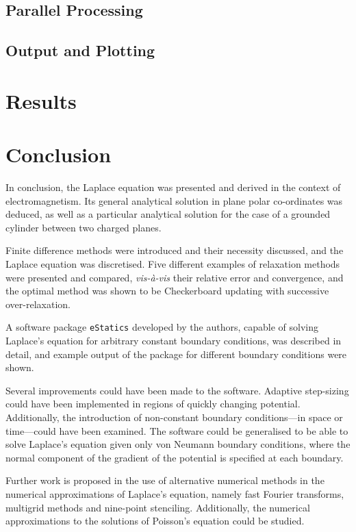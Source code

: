 \documentclass[11pt, a4paper]{article}
\begin{document}
\subsection{Parallel Processing}


\subsection{Output and Plotting}


\section{Results}
%

\section{Conclusion}
In conclusion, the Laplace equation was presented and derived in the context of
electromagnetism. Its general analytical solution in plane polar co-ordinates was
deduced, as well as a particular analytical solution for the case of a grounded
cylinder between two charged planes.

Finite difference methods were introduced and their necessity discussed, and the
Laplace equation was discretised. Five different examples of relaxation methods were
presented and compared, \emph{vis-\`{a}-vis} their relative error and convergence, and
the optimal method was shown to be Checkerboard updating with successive over-relaxation.

A software package \lstinline|eStatics| developed by the authors, capable of solving
Laplace's equation for arbitrary constant boundary conditions, was described in detail,
and example output of the package for different boundary conditions were shown.

Several improvements could have been made to the software. Adaptive step-sizing could
have been implemented in regions of quickly changing potential. Additionally, the
introduction of non-constant boundary conditions---in space or time---could have been
examined. The software could be generalised to be able to solve Laplace's equation given
only von Neumann boundary conditions, where the normal component of the gradient of the
potential is specified at each boundary. 

Further work is proposed in the use of alternative numerical methods in the
numerical approximations of Laplace's equation, namely fast Fourier transforms,
multigrid methods and nine-point stenciling. Additionally, the numerical approximations
to the solutions of Poisson's equation could be studied.
\end{document}
